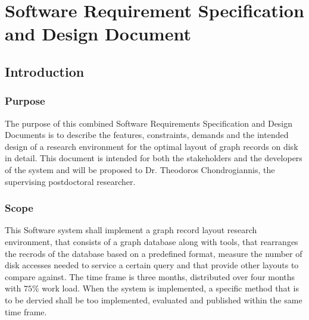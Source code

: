 \section{Software Requirement Specification and Design Document}

\subsection{Introduction}
	\subsubsection{Purpose}
			The purpose of this combined Software Requirements Specification and Design Documents is to describe the features, constraints, demands and the intended design of a research environment for the optimal layout of graph records on disk in detail. This document is intended for both the stakeholders and the developers of the system and will be proposed to Dr. Theodoros Chondrogiannis, the supervising postdoctoral researcher.
	\subsubsection{Scope}
			This Software system shall implement a graph record layout research environment, that consists of a graph database along with tools, that rearranges the recrods of the database based on a predefined format, measure the number of disk accesses needed to service a certain query and that provide other layouts to compare against. The time frame is three months, distributed over four months with $75\%$ work load. When the system is implemented, a specific method that is to be dervied shall be too implemented, evaluated and published within the same time frame.


